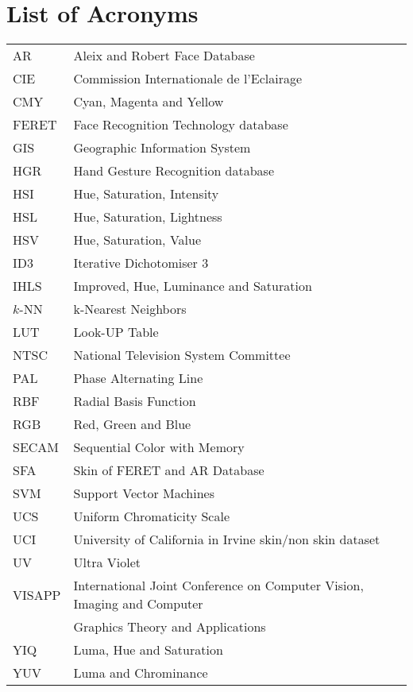 \documentclass[11pt,twoside,a4paper]{book}
\theoremstyle{plain}
\theoremstyle{definition}
\begin{document}
\chapter{List of Acronyms}
\begin{tabular}{ll}
    AR          & Aleix and Robert Face Database\\
    CIE         & Commission Internationale de l'Eclairage\\
    CMY         & Cyan, Magenta and Yellow\\
    FERET       & Face Recognition Technology database\\
    GIS         & Geographic Information System\\
    HGR         & Hand Gesture Recognition database\\
    HSI         & Hue, Saturation, Intensity\\
    HSL         & Hue, Saturation, Lightness\\
    HSV         & Hue, Saturation, Value\\
    ID3         & Iterative Dichotomiser 3\\
    IHLS        & Improved, Hue, Luminance and Saturation\\
    $k$-NN      & k-Nearest Neighbors\\
    LUT         & Look-UP Table\\
    NTSC        & National Television System Committee\\
    PAL         & Phase Alternating Line\\
    RBF         & Radial Basis Function\\
    RGB         & Red, Green and Blue\\
    SECAM       & Sequential Color with Memory\\
    SFA         & Skin of FERET and AR Database\\
    SVM         & Support Vector Machines\\
    UCS         & Uniform Chromaticity Scale\\
    UCI         & University of California in Irvine skin/non skin dataset\\
    UV          & Ultra Violet\\
    VISAPP      & International Joint Conference on Computer Vision, Imaging and Computer\\
                & Graphics Theory and Applications\\
    YIQ         & Luma, Hue and Saturation\\
    YUV         & Luma and Chrominance\\
\end{tabular}
\end{document}
